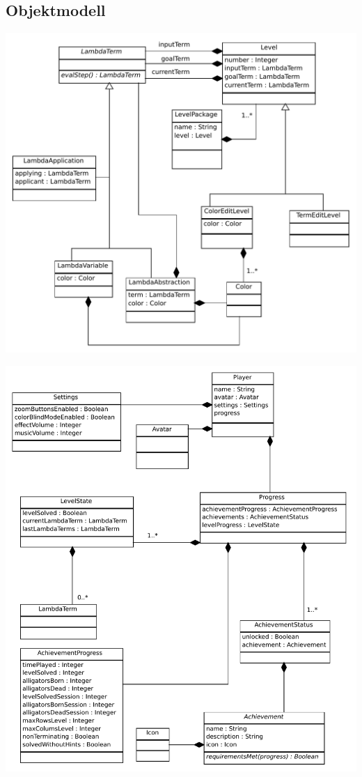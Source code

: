 \subsection{Objektmodell}
\begin{center}
\includegraphics[scale=0.6]{Systemmodelle/level_class.pdf}
\end{center}
\clearpage
\begin{center}
\includegraphics[scale=0.6]{Systemmodelle/player_class.pdf}
\end{center}
